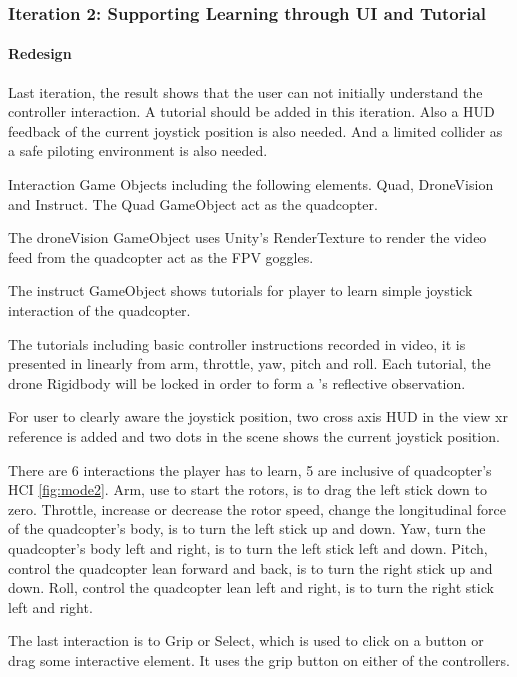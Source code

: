 \subsubsection{Iteration 2: Supporting Learning through UI and Tutorial}

\paragraph{Redesign}

Last iteration, the result shows that the user can not initially understand the controller interaction. A tutorial should be added in this iteration. Also a HUD feedback of the current joystick position is also needed. And a limited collider as a safe piloting environment is also needed.

Interaction Game Objects including the following elements. Quad, DroneVision and Instruct.
The Quad GameObject act as the quadcopter. 

The droneVision GameObject uses Unity's RenderTexture to render the video feed from the quadcopter act as the FPV goggles.

The instruct GameObject shows tutorials for player to learn simple joystick interaction of the quadcopter.

The tutorials including basic controller instructions recorded in video, it is presented in linearly from arm, throttle, yaw, pitch and roll. Each tutorial, the drone Rigidbody will be locked in order to form a \textcite{kolb1984}'s reflective observation. 

For user to clearly aware the joystick position, two cross axis HUD in the view xr reference is added and two dots in the scene shows the current joystick position.

There are 6 interactions the player has to learn, 5 are inclusive of quadcopter's HCI \cref{fig:mode2}. 
Arm, use to start the rotors, is to drag the left stick down to zero.
Throttle, increase or decrease the rotor speed, 
change the longitudinal force of the quadcopter's body, is to turn the left stick up and down.
Yaw, turn the quadcopter's body left and right, is to turn the left stick left and down.
Pitch, control the quadcopter lean forward and back, is to turn the right stick up and down.
Roll, control the quadcopter lean left and right, is to turn the right stick left and right.

The last interaction is to Grip or Select, which is used to click on a button or drag some interactive element.
It uses the grip button on either of the controllers.


